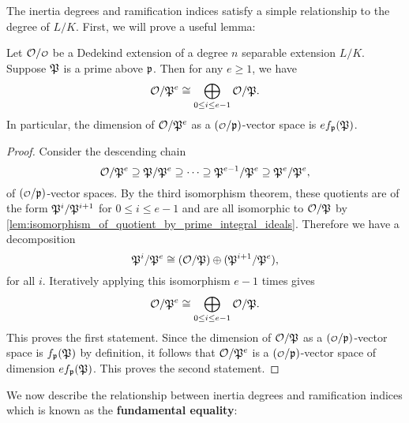     The inertia degrees and ramification indices satisfy a simple relationship to the degree of $L/K$. First, we will prove a useful lemma:

    \begin{lemma}\label{lem:quotient_by_prime_power_isomorphism}
      Let $\mc{O}/\smc{O}$ be a Dedekind extension of a degree $n$ separable extension $L/K$. Suppose $\mathfrak{P}$ is a prime above $\mathfrak{p}$. Then for any $e \ge 1$, we have
      \[
        \mathcal{O}/\mathfrak{P}^{e} \cong \bigoplus_{0 \le i \le e-1}\mathcal{O}/\mathfrak{P}.
      \]
      In particular, the dimension of $\mathcal{O}/\mathfrak{P}^{e}$ as a $(\smc{O}/\mf{p})$-vector space is $ef_{\mathfrak{p}}(\mathfrak{P})$.
    \end{lemma}
    \begin{proof}
      Consider the descending chain
      \[
        \mathcal{O}/\mathfrak{P}^{e} \supseteq \mathfrak{P}/\mathfrak{P}^{e} \supseteq \cdots \supseteq \mathfrak{P}^{e-1}/\mathfrak{P}^{e} \supseteq \mathfrak{P}^{e}/\mathfrak{P}^{e},
      \]
      of $(\smc{O}/\mf{p})$-vector spaces. By the third isomorphism theorem, these quotients are of the form $\mathfrak{P}^{i}/\mathfrak{P}^{i+1}$ for $0 \le i \le e-1$ and are all isomorphic to $\mathcal{O}/\mathfrak{P}$ by \cref{lem:isomorphism_of_quotient_by_prime_integral_ideals}. Therefore we have a decomposition
      \[
        \mathfrak{P}^{i}/\mathfrak{P}^{e} \cong (\mathcal{O}/\mathfrak{P}) \oplus (\mathfrak{P}^{i+1}/\mathfrak{P}^{e}),
      \]
      for all $i$. Iteratively applying this isomorphism $e-1$ times gives
      \[
        \mathcal{O}/\mathfrak{P}^{e} \cong \bigoplus_{0 \le i \le e-1}\mathcal{O}/\mathfrak{P}.
      \]
      This proves the first statement. Since the dimension of $\mathcal{O}/\mathfrak{P}$ as a $(\smc{O}/\mf{p})$-vector space is $f_{\mathfrak{p}}(\mathfrak{P})$ by definition, it follows that $\mathcal{O}/\mathfrak{P}^{e}$ is a $(\smc{O}/\mf{p})$-vector space of dimension $ef_{\mathfrak{p}}(\mathfrak{P})$. This proves the second statement.
    \end{proof}
    
    We now describe the relationship between inertia degrees and ramification indices which is known as the \textbf{fundamental equality}:

